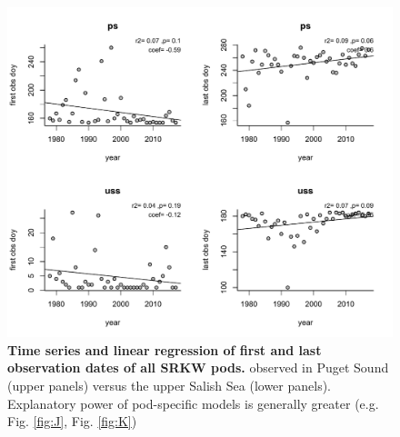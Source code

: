 \documentclass{article}
\begin{document}
  \begin{figure}[p]
\includegraphics{../analyses/orcaphen/figures/linreg_1978_2017.pdf} 
\caption{\textbf{Time series and linear regression of first and last observation dates of all SRKW pods.} observed in Puget Sound (upper panels) versus the upper Salish Sea (lower panels). Explanatory power of pod-specific models is generally greater (e.g. Fig. \ref{fig:J}, Fig. \ref{fig:K})}
 \label{fig:reg}
 \end{figure}
 
\end{document}

